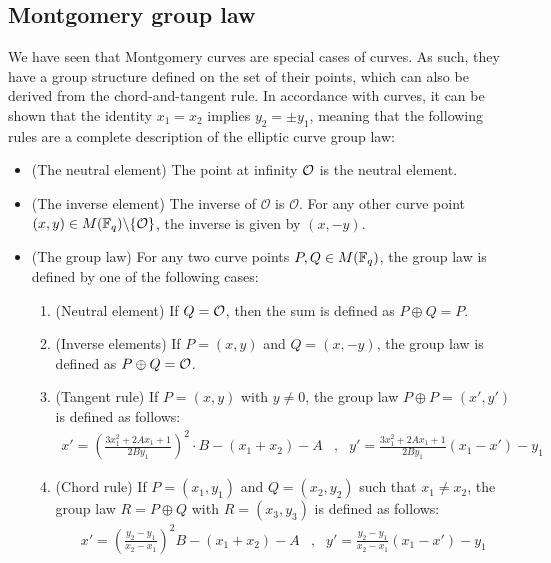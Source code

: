 \subsection{Montgomery group law} We have seen that Montgomery curves are special cases of  curves. As such, they have a group structure defined on the set of their points, which can also be derived from the chord-and-tangent rule. In accordance with  curves, it can be shown that the identity $x_1=x_2$ implies $y_2=\pm y_1$, meaning that the following rules are a complete description of the elliptic curve group law:

\begin{definition}\label{def:montgomery-group-law}

\begin{itemize}
\item (The neutral element) The point at infinity $\mathcal{O}$ is the neutral element.
\item (The inverse element) The inverse of $\mathcal{O}$ is $\mathcal{O}$. For any other curve point $(x,y) \in M(\mathbb{F}_q)\backslash \{\mathcal{O}\}$, the inverse is given by $(x,-y)$.
\item (The group law) For any two curve points $P, Q \in M(\mathbb{F}_q)$, the group law is defined by one of the following cases:
\begin{enumerate}
\item (Neutral element) If $Q=\mathcal{O}$, then the sum is defined as $P\oplus Q=P$.
\item (Inverse elements)  If $P=(x,y)$ and $Q=(x,-y)$, the group law is defined as $P\oplus Q=\mathcal{O}$.
\item (Tangent rule) If $P=(x,y)$ with $y\neq 0$, the group law $P\oplus P=(x',y')$ is defined as follows:
$$
\begin{array}{llr}
x' = (\frac{3x_1^2 + 2A x_1 +1}{2By_1})^2\cdot B - (x_1 + x_2) - A &,&
y' = \frac{3x_1^2 + 2A x_1 +1}{2By_1}(x_1-x') - y_1
\end{array} 
$$
\item (Chord rule) If $P=(x_1,y_1)$ and $Q=(x_2,y_2)$ such that $x_1 \neq x_2$, the group law $R=P\oplus Q$ with $R=(x_3,y_3)$ is defined as follows:
$$
\begin{array}{llr}
x' = (\frac{y_2-y_1}{x_2-x_1})^2B - (x_1 + x_2) - A &, &
y' = \frac{y_2-y_1}{x_2-x_1}(x_1-x') - y_1
\end{array} 
$$
\end{enumerate}
\end{itemize}
\end{definition}
